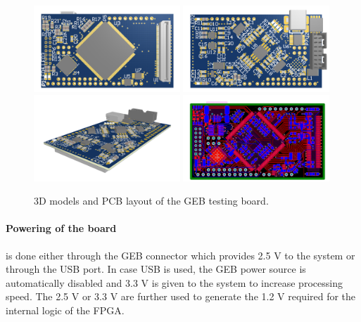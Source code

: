       \begin{figure}[h!]
        \centering
        \includegraphics[width=0.49\textwidth]{img/II-4-qualification/geb-3d-0.png}
        \includegraphics[width=0.49\textwidth]{img/II-4-qualification/geb-3d-1.png}
        \vspace*{0.3cm}
        \includegraphics[width=0.49\textwidth]{img/II-4-qualification/geb-3d-2.png}
        \includegraphics[width=0.49\textwidth]{img/II-4-qualification/geb-pcb.png}
        \caption{3D models and PCB layout of the GEB testing board.}
        \label{fig:II-4-geb-pcb}
      \end{figure}

      \paragraph{Powering of the board} is done either through the GEB connector which provides 2.5 V to the system or through the USB port. In case USB is used, the GEB power source is automatically disabled and 3.3 V is given to the system to increase processing speed. The 2.5 V or 3.3 V are further used to generate the 1.2 V required for the internal logic of the FPGA.

